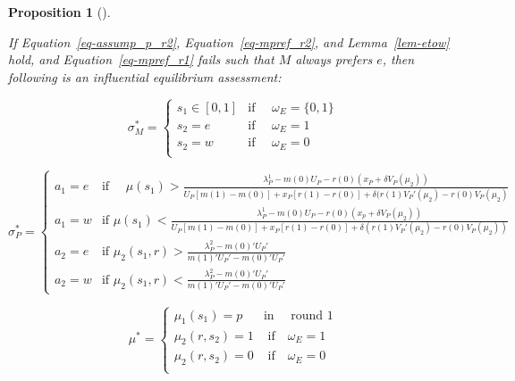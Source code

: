 \documentclass[
  12pt,
]{article}
\theoremstyle{plain}
\theoremstyle{plain}
\newtheorem{proposition}{Proposition}[section]
\theoremstyle{remark}
\begin{document}
\begin{proposition}[]\protect\hypertarget{prp-transition1}{}\label{prp-transition1}

If Equation~\ref{eq-assump_p_r2}, Equation~\ref{eq-mpref_r2}, and
Lemma~\ref{lem-etow} hold, and Equation~\ref{eq-mpref_r1} fails such
that \(M\) always prefers \(e\), then following is an influential
equilibrium assessment:

\[
\sigma^{*}_M = 
\begin{cases}
s_1 \in [0, 1] & \text{if } \quad \omega_E = \{0, 1\} \\
s_2 = e  & \text{if } \quad \omega_E = 1\\
s_2 = w  & \text{if } \quad \omega_E = 0\\
\end{cases}
\]

\[
\sigma^{*}_P = 
\begin{cases}
a_1= e  & \text{if } \quad\mu(s_1)
> \frac{\lambda^1_P - m(0)U_P - r(0)(x_P + \delta V_P(\mu_2))}
 {U_P[ m(1) - m(0) ]+ x_P [r(1) -r(0)] 
 + \delta (r(1)V_P'(\mu_2) - r(0)V_P(\mu_2)}\\
a_1 = w  & \text{if } \mu(s_1)
< \frac{\lambda^1_P - m(0)U_P - r(0)(x_p + \delta V_P(\mu_2))}
 {U_P[ m(1) - m(0) ]+ x_P [r(1) -r(0)] 
 + \delta (r(1)V_P'(\mu_2) - r(0)V_P(\mu_2))}\\
a_2 = e & \text{if } \mu_2(s_1, r) > \frac{\lambda^2_P - m(0)' U_P '}{m(1)' U_P' - m(0)' U_P'}\\
a_2 = w & \text{if } \mu_2(s_1, r) < \frac{\lambda^2_P - m(0)' U_P '}{m(1)' U_P' - m(0)' U_P'}
\end{cases}
\]

\[
\mu^* = 
\begin{cases}
\mu_1(s_1) = p  & \text{in } \quad \text{round 1}\\
\mu_2(r, s_2) = 1 & \text{ if} \quad \omega_E = 1\\
\mu_2(r, s_2) = 0 & \text{ if} \quad \omega_E = 0\\
\end{cases}
\]

\end{proposition}
\end{document}
